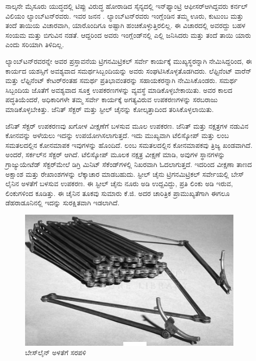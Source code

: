 ನಾಲ್ಕನೇ ಮೈಸೂರು ಯುದ್ಧದಲ್ಲಿ ಟಿಪ್ಪು ವಿರುದ್ಧ ಹೋರಾಡಿದ ಸೈನ್ಯದಲ್ಲಿ ಇನ್​ಫ್ಯಾಂಟ್ರಿ ಆಫೀಸರ್​ ಆಗಿದ್ದವರು ಕರ್ನಲ್​ ವಿಲಿಯಂ ಲ್ಯಾಂಬ್​ಟನ್​ರವರು. ಇವರ ಜನನ . ಲ್ಯಾಂಬ್​ಟನ್​ರವರು ಇಂಗ್ಲೆಂಡಿನ ತಮ್ಮ ಊರು, ಕುಟುಂಬ ಮತ್ತು ತಂದೆ ತಾಯಿಯ ವಿಚಾರವಾಗಿ, ಯಾರೊಂದಿಗೂ ಅಷ್ಟಾಗಿ ಹಂಚಿಕೊಳ್ಳುತ್ತಿರಲಿಲ್ಲ. ಈ ವಿಚಾರದಲ್ಲಿ ಅವರದ್ದು ಬಹಳ ಸಂಯಮ ಮತ್ತು ಬಿಗುವಿನ ನಡತೆ. ಆದ್ದರಿಂದ ಅವರು ಇಂಗ್ಲೆಂಡ್​ನಲ್ಲಿ ಎಲ್ಲಿ ಜನಿಸಿದರು ಮತ್ತು ತಂದೆ ತಾಯಿ ಯಾರು ಎಂದು ಸರಿಯಾಗಿ ತಿಳಿದಿಲ್ಲ.

ಲ್ಯಾಂಬ್​ಟನ್​ರವರನ್ನೇ ಅವರ ಪ್ರಸ್ತಾವನೆಯ ಟ್ರಿಗನಮಿಟ್ರಿಕಲ್​ ಸರ್ವೇ ಕಾರ್ಯಕ್ಕೆ ಮುಖ್ಯಸ್ಥರನ್ನಾಗಿ ನೇಮಿಸಿದ್ದರಿಂದ, ಈ ಕಾರ್ಯದ ಯಶಸ್ಸಿಗೆ ಅವಶ್ಯವಾದ ಸಮರ್ಥ\break ಸಿಬ್ಬಂದಿಯನ್ನು ಅವರು ಸಂಘಟಿಸಿಕೊಳ್ಳತೊಡಗಿದರು. ಲೆಫ್ಟಿನೆಂಟ್​ ವಾರೆನ್​ ಮತ್ತು ಲೆಫ್ಟಿನೆಂಟ್​ ಕೇಟರ್​ರಂತಹ ಸಮರ್ಥ ಪ್ರತಿಭಾವಂತರನ್ನು ಸಹಾಯಕರನ್ನಾಗಿ ನೇಮಿಸಿಕೊಂಡರು. ಸಮರ್ಥ ಸಿಬ್ಬಂದಿಯ ಜೊತೆಗೆ ಅವಶ್ಯವಾದ ಸೂಕ್ತ ಉಪಕರಣಗಳನ್ನು ವ್ಯವಸ್ಥೆ ಮಾಡಿಕೊಳ್ಳಬೇಕಾಯಿತು. ಅವರ ಕಾಲದ ಪದ್ಧತಿಯೆಂದರೆ, ಅಧಿಕಾರಿಗಳೇ ತಮ್ಮ ಸರ್ವೇ ಕಾರ್ಯಕ್ಕೆ ಅಗತ್ಯವಿರುವ ಉಪಕರಣಗಳನ್ನು ಸರಬರಾಜು ಮಾಡಿಕೊಳ್ಳಬೇಕಿತ್ತು. ಜೆನಿತ್​ ಸೆಕ್ಟರ್​ ಮತ್ತು ಸ್ಟೀಲ್​ ಚೈನನ್ನು ಕೋಲ್ಕತ್ತಾದಿಂದ ತರಿಸಿಕೊಳ್ಳಲಾಯಿತು.

ಜೆನಿತ್​ ಸೆಕ್ಟರ್​ ಉಪಕರಣವು ಖಗೋಳ ವೀಕ್ಷಣೆಗೆ ಬಳಸುವ ಮೂಲ ಉಪಕರಣ. ಜೆನಿತ್​ ಮತ್ತು ನಕ್ಷತ್ರಗಳ ನಡುವಿನ ಕೋನವನ್ನು ಅಳೆಯಲು ಇದನ್ನು ಉಪಯೋಗಿಸಲಾಗುತ್ತದೆ. ಇದು ಮುಖ್ಯವಾಗಿ ಟೆಲಿಸ್ಕೋಪ್​ ಮತ್ತು ಲಂಬ ಸಮತಲದಲ್ಲಿನ ಕೋನಮಾಪಕ ಇವುಗಳನ್ನು ಹೊಂದಿದೆ. ಲಂಬ ಸಮತಲದಲ್ಲಿನ ಕೋನಮಾಪಕವು ತ್ರಿಜ್ಯ ಖಂಡವಾಗಿದೆ. ಅಂದರೆ, ಸರ್ಕಲ್​ನ ಸೆಕ್ಟರ್​ ಆಗಿದೆ. ಟೆಲಿಸ್ಕೋಪ್​ ಮೂಲಕ ನಕ್ಷತ್ರ ವೀಕ್ಷಣೆ ಮಾಡಿ, ಅವುಗಳ ಸ್ಥಾನಗಳನ್ನು ಗ್ರಾಜ್ಯುಯೇಟೆಡ್​ ಸೆಕ್ಟರ್​ ಮೇಲೆ ಡಿಗ್ರಿ ಮಿನಿಟ್​ ಸೆಕೆಂಡ್​ಗಳಲ್ಲಿ ನಿಖರವಾಗಿ ಓದಲಾಗುತ್ತದೆ. ಇದರಿಂದ ವೀಕ್ಷಣಾ ತಾಣದ ಅಕ್ಷಾಂಶ ಮತ್ತು ರೇಖಾಂಶಗಳನ್ನು ಲೆಕ್ಕಾಚಾರ ಮಾಡಬಹುದು. ಸ್ಟೀಲ್​ ಚೈನು ಟ್ರಿಗನಮಿಟ್ರಿಕಲ್​ ಸರ್ವೇಯಲ್ಲಿ ಬೇಸ್​ಲೈನಿನ ಅಳತೆಗೆ ಬಳಸುವ ಉಪಕರಣ. ಈ ಸ್ಟೀಲ್​ ಚೈನು ನೂರು ಅಡಿ ಉದ್ದವಿದ್ದು, ಪ್ರತಿ ಲಿಂಕು  ಅಡಿ ಇರುವ,  ಲಿಂಕುಗಳಿಂದ ಕೂಡಿತ್ತು. ಈ ಚೈನಿನ ತೂಕವು ಸುಮಾರು  ಕೆ.ಜಿ. ಅದರ ಚಾರಿತ್ರಿಕ ಪ್ರಾಮುಖ್ಯತೆಗಾಗಿ ಈಗಲೂ ಡೆಹರಾಡೂನಿನಲ್ಲಿ ಇದನ್ನು ಸುರಕ್ಷಿತವಾಗಿ ಇಡಲಾಗಿದೆ.

\begin{figure}[!htbp]
\includegraphics[scale=1.5]{"images/image006.jpg"}
\caption{ಬೇಸ್‌ಲೈನ್ ಅಳತೆಗೆ ಸರಪಳಿ}\label{chap4-fig2}
\end{figure}

